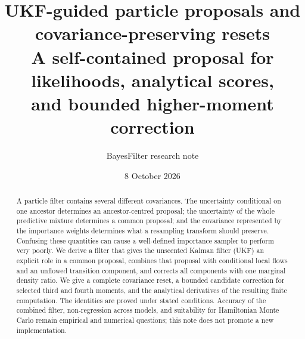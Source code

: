 \documentclass[11pt,a4paper]{article}
\title{UKF-guided particle proposals and covariance-preserving resets\\
\large A self-contained proposal for likelihoods, analytical scores,\\
and bounded higher-moment correction}
\author{BayesFilter research note}
\date{8 October 2026}
\begin{document}
\maketitle

\begin{abstract}
A particle filter contains several different covariances. The uncertainty
conditional on one ancestor determines an ancestor-centred proposal; the
uncertainty of the whole predictive mixture determines a common proposal; and
the covariance represented by the importance weights determines what a
resampling transform should preserve. Confusing these quantities can cause a
well-defined importance sampler to perform very poorly. We derive a filter
that gives the unscented Kalman filter (UKF) an explicit role in a common
proposal, combines that proposal with conditional local flows and an unflowed
transition component, and corrects all components with one marginal density
ratio. We give a complete covariance reset, a bounded candidate correction for
selected third and fourth moments, and the analytical derivatives of the
resulting finite computation. The identities are proved under stated
conditions. Accuracy of the combined filter, non-regression across models,
and suitability for Hamiltonian Monte Carlo remain empirical and numerical
questions; this note does not promote a new implementation.
\end{abstract}

\tableofcontents





\end{document}
